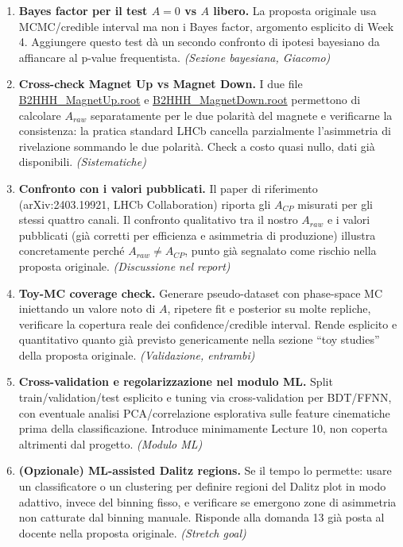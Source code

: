 \documentclass[11pt,a4paper]{article}
\begin{document}
\begin{enumerate}[leftmargin=1.4em]
    \item \textbf{Bayes factor per il test $A=0$ vs $A$ libero.} La proposta originale usa MCMC/credible interval ma non i Bayes factor, argomento esplicito di Week 4. Aggiungere questo test d\`a un secondo confronto di ipotesi bayesiano da affiancare al p-value frequentista. \emph{(Sezione bayesiana, Giacomo)}

    \item \textbf{Cross-check Magnet Up vs Magnet Down.} I due file \url{B2HHH_MagnetUp.root} e \url{B2HHH_MagnetDown.root} permettono di calcolare $A_{raw}$ separatamente per le due polarit\`a del magnete e verificarne la consistenza: la pratica standard LHCb cancella parzialmente l'asimmetria di rivelazione sommando le due polarit\`a. Check a costo quasi nullo, dati gi\`a disponibili. \emph{(Sistematiche)}

    \item \textbf{Confronto con i valori pubblicati.} Il paper di riferimento (arXiv:2403.19921, LHCb Collaboration) riporta gli $A_{CP}$ misurati per gli stessi quattro canali. Il confronto qualitativo tra il nostro $A_{raw}$ e i valori pubblicati (gi\`a corretti per efficienza e asimmetria di produzione) illustra concretamente perch\'e $A_{raw} \neq A_{CP}$, punto gi\`a segnalato come rischio nella proposta originale. \emph{(Discussione nel report)}

    \item \textbf{Toy-MC coverage check.} Generare pseudo-dataset con phase-space MC iniettando un valore noto di $A$, ripetere fit e posterior su molte repliche, verificare la copertura reale dei confidence/credible interval. Rende esplicito e quantitativo quanto gi\`a previsto genericamente nella sezione ``toy studies'' della proposta originale. \emph{(Validazione, entrambi)}

    \item \textbf{Cross-validation e regolarizzazione nel modulo ML.} Split train/validation/test esplicito e tuning via cross-validation per BDT/FFNN, con eventuale analisi PCA/correlazione esplorativa sulle feature cinematiche prima della classificazione. Introduce minimamente Lecture 10, non coperta altrimenti dal progetto. \emph{(Modulo ML)}

    \item \textbf{(Opzionale) ML-assisted Dalitz regions.} Se il tempo lo permette: usare un classificatore o un clustering per definire regioni del Dalitz plot in modo adattivo, invece del binning fisso, e verificare se emergono zone di asimmetria non catturate dal binning manuale. Risponde alla domanda 13 gi\`a posta al docente nella proposta originale. \emph{(Stretch goal)}
\end{enumerate}
\end{document}
